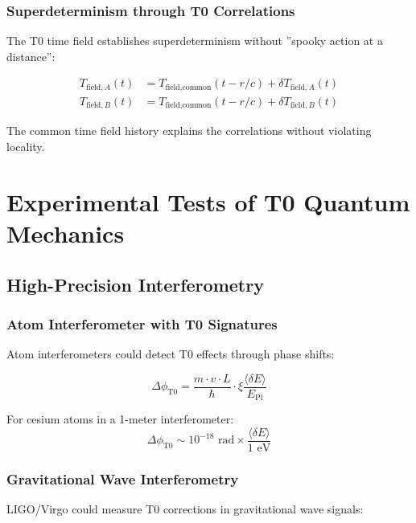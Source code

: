 \documentclass[12pt,a4paper]{article}
\newcommand{\xipar}{\xi}
\newcommand{\deltaE}{\delta E}
\newcommand{\EPlanck}{E_{\text{Pl}}}
\begin{document}
	\subsubsection{Superdeterminism through T0 Correlations}
	
	The T0 time field establishes superdeterminism without ''spooky action at a distance'':
	
	\begin{align}
		T_{\text{field},A}(t) &= T_{\text{field},\text{common}}(t-r/c) + \delta T_{\text{field},A}(t) \\
		T_{\text{field},B}(t) &= T_{\text{field},\text{common}}(t-r/c) + \delta T_{\text{field},B}(t)
	\end{align}
	
	The common time field history explains the correlations without violating locality.
	
	\section{Experimental Tests of T0 Quantum Mechanics}
	
	\subsection{High-Precision Interferometry}
	
	\subsubsection{Atom Interferometer with T0 Signatures}
	
	Atom interferometers could detect T0 effects through phase shifts:
	
	\begin{equation}
		\Delta\phi_{\text{T0}} = \frac{m \cdot v \cdot L}{\hbar} \cdot \xipar \frac{\langle\deltaE\rangle}{\EPlanck}
	\end{equation}
	
	For cesium atoms in a 1-meter interferometer:
	\begin{equation}
		\Delta\phi_{\text{T0}} \sim 10^{-18} \text{ rad} \times \frac{\langle\deltaE\rangle}{1 \text{ eV}}
	\end{equation}
	
	\subsubsection{Gravitational Wave Interferometry}
	
	LIGO/Virgo could measure T0 corrections in gravitational wave signals:
	
\end{document}
